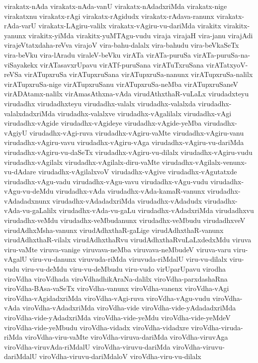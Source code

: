 {virakatx-nAda
virakatx-nAda-vanU
virakatx-nAdadxriMda
virakatx-nige
virakatxnu
virakatx-rAgi
virakatx-rAgidudx
virakatx-rAdava-ranunx
virakatx-rAda-varU
virakatx-LAgiru-valilx
virakatx-vAgiru-vu-dariMda
virakitx
virakitx-yanunx
virakitx-yiMda
virakitx-yuMTAgu-vudu
viraja
virajaH
vira-janu
virajAdi
virajeVtatxdaha-reVva
virajoV
vira-bahu-dalalx
vira-bahudu
vira-beVkaSeTx
vira-beVku
vira-lAradu
viraleV-beVku
virATa
virATa-puruSa
virATa-puruSa-na-viSayakekx
virATasavxrUpavu
virATf-puruSana
virATuTxruSana
virATatxyoV-reVSa
virATupxruSa
virATupxruSana
virATupxruSa-nanunx
virATupxruSa-nalilx
virATupxruSa-nige
virATupxruSanu
virATupxruSa-neMba
virATupxruSaneV
virADAtamx-nalilx
virAmasAthxna-vAda
virudAthxthaR-vuLaLx
virudadxteyu
virudadhx
virudadhxteyu
virudadhx-valalx
virudadhx-valalxda
virudadhx-valalxdadxriMda
virudadhx-valalxve
virudadhx-vAgalilalx
virudadhx-vAgi
virudadhx-vAgide
virudadhx-vAgideye
virudadhx-vAgide-yeMba
virudadhx-vAgiyU
virudadhx-vAgi-ruva
virudadhx-vAgiru-vaMte
virudadhx-vAgiru-vanu
virudadhx-vAgiru-vavu
virudadhx-vAgiru-vAga
virudadhx-vAgiru-vu-dariMda
virudadhx-vAgiru-vu-daSeTx
virudadhx-vAgiru-vu-dilalx
virudadhx-vAgiru-vudu
virudadhx-vAgilalx
virudadhx-vAgilalx-diru-vaMte
virudadhx-vAgilalx-venunx-vu-dAdare
virudadhx-vAgilalxvoV
virudadhx-vAgive
virudadhx-vAgutatxde
virudadhx-vAgu-vadu
virudadhx-vAgu-vavu
virudadhx-vAgu-vudu
virudadhx-vAgu-vu-deMdu
virudadhx-vAda
virudadhx-vAda-kamaR-vanunx
virudadhx-vAdadadxnunx
virudadhx-vAdadadxriMda
virudadhx-vAdadudx
virudadhx-vAda-vu-gaLalilx
virudadhx-vAda-vu-gaLu
virudadhx-vAdadxriMda
virudadhxvu
virudadhx-veMdu
virudadhx-veMbudanunx
virudadhx-veMbudu
virudadhxveV
virudAdhxMsha-vanunx
virudAdhxthaR-gaLige
virudAdhxthaR-vanunx
virudAdhxthaR-vilalx
virudAdhxthaRvu
virudAdhxthaRvuLaLxdedxMdu
viruva
viru-vaMte
viruva-vanige
viruvava-neMba
viruvava-neMbudeV
viruva-varu
viru-vAgalU
viru-vu-danunx
viruvuda-riMda
viruvuda-riMdalU
viru-vu-dilalx
viru-vudu
viru-vu-deMdu
viru-vu-deMbudu
viru-vudo
virUparUpavu
virodha
viroVdha
viroVdhada
viroVdhadhikAraNa-dalilx
viroVdha-parxdashaRna
viroVdha-BAsa-vaSeTx
viroVdha-vanunx
viroVdha-vanenx
viroVdha-vAgi
viroVdha-vAgidadxriMda
viroVdha-vAgi-ruva
viroVdha-vAgu-vudu
viroVdha-vAda
viroVdha-vAdadxriMda
viroVdha-vide
viroVdha-vide-yAdadadxriMda
viroVdha-vide-yAdadxriMda
viroVdha-vide-yeMdu
viroVdha-vide-yeMdeV
viroVdha-vide-yeMbudu
viroVdha-vidadx
viroVdha-vidadxre
viroVdha-viruda-riMda
viroVdha-viru-vaMte
viroVdha-viruva-dariMda
viroVdha-viruvAga
viroVdha-viruvAda-riMdalU
viroVdha-viruvu-dariMda
viroVdha-viruvu-dariMdalU
viroVdha-viruvu-dariMdaloV
viroVdha-viru-vu-dilalx
}
